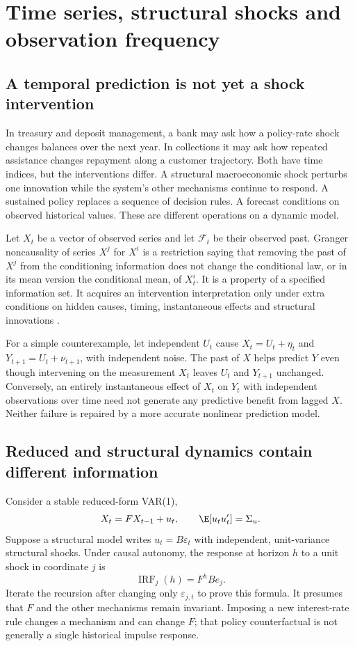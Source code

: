 \chapter{Time series, structural shocks and observation frequency}
\label{r3:time-series}
\section{A temporal prediction is not yet a shock intervention}
In treasury and deposit management, a bank may ask how a policy-rate
shock changes balances over the next year. In collections it may ask
how repeated assistance changes repayment along a customer trajectory.
Both have time indices, but the interventions differ. A structural
macroeconomic shock perturbs one innovation while the system's other
mechanisms continue to respond. A sustained policy replaces a sequence
of decision rules. A forecast conditions on observed historical values.
These are different operations on a dynamic model.

Let $X_t$ be a vector of observed series and let $\mathcal F_t$ be
their observed past. Granger noncausality of series $X^j$ for $X^i$
is a restriction saying that removing the past of $X^j$ from the
conditioning information does not change the conditional law, or in
its mean version the conditional mean, of $X^i_t$. It is a property
of a specified information set. It acquires an intervention
interpretation only under extra conditions on hidden causes, timing,
instantaneous effects and structural innovations
\citep[Chapter 10, Section 10.3]{peters2017}.

For a simple counterexample, let independent $U_t$ cause
$X_t=U_t+\eta_t$ and $Y_{t+1}=U_t+\nu_{t+1}$, with independent
noise. The past of $X$ helps predict $Y$ even though intervening on
the measurement $X_t$ leaves $U_t$ and $Y_{t+1}$ unchanged.
Conversely, an entirely instantaneous effect of $X_t$ on $Y_t$ with
independent observations over time need not generate any predictive
benefit from lagged $X$. Neither failure is repaired by a more
accurate nonlinear prediction model.

\section{Reduced and structural dynamics contain different information}
\label{r3:svar}
Consider a stable reduced-form VAR(1),
\[
 X_t=FX_{t-1}+u_t,\qquad \E[u_tu_t']=\Sigma_u.
\]
Suppose a structural model writes $u_t=B\varepsilon_t$ with
independent, unit-variance structural shocks. Under causal autonomy,
the response at horizon $h$ to a unit shock in coordinate $j$ is
\begin{equation}
 \operatorname{IRF}_j(h)=F^hBe_j.
 \label{r3:structural-irf}
\end{equation}
Iterate the recursion after changing only $\varepsilon_{j,t}$ to
prove this formula. It presumes that $F$ and the other mechanisms
remain invariant. Imposing a new interest-rate rule changes a mechanism
and can change $F$; that policy counterfactual is not generally a
single historical impulse response.

